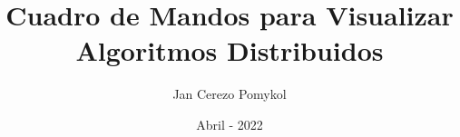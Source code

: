 
\newcommand{\NombreAutor}{Jan Cerezo Pomykol}

\newcommand{\Grado}{Ingeniería Informática}

\newcommand{\TituloTFG}{Cuadro de Mandos para Visualizar Algoritmos Distribuidos}

\newcommand{\NombreTutor}{Fernando Pérez Costoya}

\newcommand{\Departamento}{Departamento de Arquitectura y Tecnología de Sistemas Informáticos}

\newcommand{\Fecha}{Abril - 2022}

\title{\TituloTFG}
\author{\NombreAutor}
\date{\Fecha}
